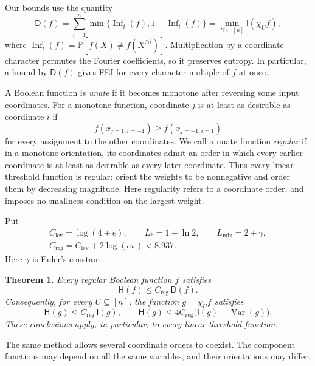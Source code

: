 \documentclass[11pt]{amsart}
\newtheorem{mainthm}{Theorem}
\theoremstyle{definition}
\theoremstyle{remark}
\renewcommand{\P}{\mathbb P}
\newcommand{\HH}{\mathsf H}
\newcommand{\I}{\mathsf I}
\newcommand{\D}{\mathsf D}
\DeclareMathOperator{\Var}{Var}
\DeclareMathOperator{\Inf}{Inf}
\newcommand{\Lp}{L_*}
\newcommand{\Lmix}{L_{\mathrm{mix}}}
\newcommand{\Clev}{C_{\mathrm{lev}}}
\newcommand{\Creg}{C_{\mathrm{reg}}}
\begin{document}
Our bounds use the quantity
\begin{equation}\label{eq:D}
 \D(f)=\sum_{i=1}^n\min\{\Inf_i(f),1-\Inf_i(f)\}
      =\min_{U\subseteq[n]}\I(\chi_U f),
\end{equation}
where $\Inf_i(f)=\P[f(X)\ne f(X^{\oplus i})]$.
Multiplication by a coordinate character permutes the Fourier coefficients, so it preserves entropy. In particular, a bound by $\D(f)$ gives FEI for every character multiple of $f$ at once.

A Boolean function is \emph{unate} if it becomes monotone after reversing some input coordinates.
For a monotone function, coordinate $j$ is at least as desirable as coordinate $i$ if
\begin{equation}\label{eq:desire}
 f(x_{j=1,i=-1})\ge f(x_{j=-1,i=1})
\end{equation}
for every assignment to the other coordinates.
We call a unate function \emph{regular} if, in a monotone orientation, its coordinates admit an order in which every earlier coordinate is at least as desirable as every later coordinate.
Thus every linear threshold function is regular: orient the weights to be nonnegative and order them by decreasing magnitude.
Here regularity refers to a coordinate order, and imposes no smallness condition on the largest weight.

Put
\begin{equation}\label{eq:constants}
 \begin{gathered}
 \Clev=\log(4+e),\qquad \Lp=1+\ln2,\qquad \Lmix=2+\gamma,\\
 \Creg=\Clev+2\log(e\pi)<8.937.
 \end{gathered}
\end{equation}
Here $\gamma$ is Euler's constant.

\begin{mainthm}\label{thm:A}
Every regular Boolean function $f$ satisfies
\begin{equation}\label{eq:mainreg}
 \HH(f)\le\Creg\,\D(f).
\end{equation}
Consequently, for every $U\subseteq[n]$, the function $g=\chi_Uf$ satisfies
\[
 \HH(g)\le\Creg\,\I(g),
 \qquad
 \HH(g)\le4\Creg\bigl(\I(g)-\Var(g)\bigr).
\]
These conclusions apply, in particular, to every linear threshold function.
\end{mainthm}

The same method allows several coordinate orders to coexist. The component functions may depend on all the same variables, and their orientations may differ.
\end{document}
